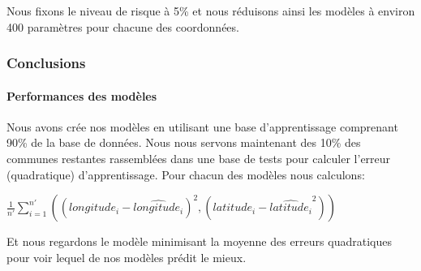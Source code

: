 \documentclass[french]{article}%
\begin{document}
			Nous fixons le niveau de risque à 5\% et nous réduisons ainsi les modèles à environ 400 paramètres pour chacune des coordonnées.
	
%	
%				
%		
%			
%			
%			 
%		
	
	\subsubsection{Conclusions}
	
		\paragraph*{Performances des modèles}
		
			Nous avons crée nos modèles en utilisant une base d'apprentissage comprenant 90\% de la base de données. Nous nous servons maintenant des 10\% des communes restantes rassemblées dans une base de tests pour calculer l'erreur (quadratique) d'apprentissage. Pour chacun des modèles nous calculons:
			
			$\frac{1}{n'}\sum_{i=1}^{n'}((longitude_{i}-\hat{longitude_{i}})^{2},(latitude_{i}-\hat{latitude_{i}}^{2}))$
			
			Et nous regardons le modèle minimisant la moyenne des erreurs quadratiques pour voir lequel de nos modèles prédit le mieux.
			
\end{document}
